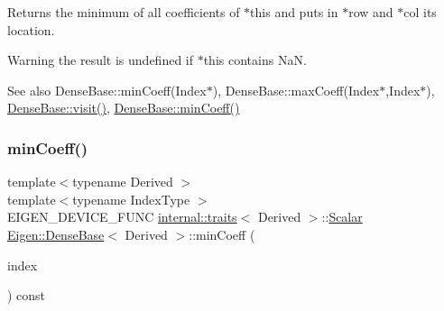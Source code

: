 \begin{DoxyReturn}{Returns}
the minimum of all coefficients of $\ast$this and puts in $\ast$row and $\ast$col its location. 
\end{DoxyReturn}
\begin{DoxyWarning}{Warning}
the result is undefined if {\ttfamily $\ast$this} contains NaN.
\end{DoxyWarning}
\begin{DoxySeeAlso}{See also}
Dense\+Base\+::min\+Coeff(\+Index$\ast$), Dense\+Base\+::max\+Coeff(\+Index$\ast$,\+Index$\ast$), \mbox{\hyperlink{class_eigen_1_1_dense_base_a7f73df3954a09c7ab0dca208b6b23ddd}{Dense\+Base\+::visit()}}, \mbox{\hyperlink{class_eigen_1_1_dense_base_a6634944be3d4fef551b57ffad30467f2}{Dense\+Base\+::min\+Coeff()}} 
\end{DoxySeeAlso}
\mbox{\label{class_eigen_1_1_dense_base_a7d6ebd550eaaee24fed7880c39ae3f35}} 
\subsubsection{\texorpdfstring{minCoeff()}{minCoeff()}\hspace{0.1cm}{\footnotesize\ttfamily [3/3]}}
{\footnotesize\ttfamily template$<$typename Derived $>$ \\
template$<$typename Index\+Type $>$ \\
E\+I\+G\+E\+N\+\_\+\+D\+E\+V\+I\+C\+E\+\_\+\+F\+U\+NC \mbox{\hyperlink{struct_eigen_1_1internal_1_1traits}{internal\+::traits}}$<$ Derived $>$\+::\mbox{\hyperlink{class_eigen_1_1_dense_base_a5feed465b3a8e60c47e73ecce83e39a2}{Scalar}} \mbox{\hyperlink{class_eigen_1_1_dense_base}{Eigen\+::\+Dense\+Base}}$<$ Derived $>$\+::min\+Coeff (\begin{DoxyParamCaption}\item[{Index\+Type $\ast$}]{index }\end{DoxyParamCaption}) const}

